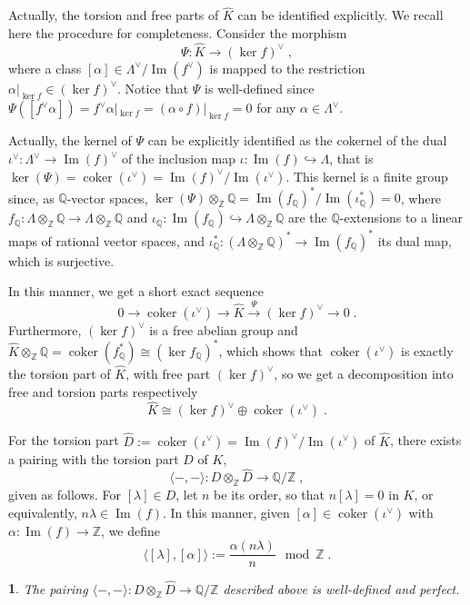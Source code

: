\documentclass[11pt,english]{amsart}
\numberwithin{equation}{section}
\numberwithin{figure}{section}
\theoremstyle{plain}
\theoremstyle{plain}
\newtheorem{lem}[thm]{\protect\lemmaname}
\theoremstyle{definition}
\theoremstyle{remark}
\DeclareMathOperator{\image}{Im}
\newcommand{\ZZ}{\mathbb{Z}}
\newcommand{\QQ}{\mathbb{Q}}
\newcommand{\coker}{\operatorname{coker}}
\providecommand{\lemmaname}{Lemma}
\begin{document}
Actually, the torsion and free parts of $\hat{K}$ can be identified explicitly. We recall here the procedure for completeness. Consider the morphism
$$
    \Psi: \hat{K} \to (\ker f)^\vee\; , 
$$
where a class $[\alpha] \in \Lambda^\vee/\image(f^\vee)$ is mapped to the restriction $\alpha|_{\ker f} \in (\ker f)^\vee$. Notice that $\Psi$ is well-defined since $\Psi([f^\vee\alpha]) = f^\vee\alpha|_{\ker f} = (\alpha \circ f)|_{\ker f} = 0$ for any $\alpha \in \Lambda^\vee$.

Actually, the kernel of $\Psi$ can be explicitly identified as the cokernel of the dual $\iota^\vee: \Lambda^\vee \to \image(f)^\vee$ of the inclusion map $\iota: \image(f) \hookrightarrow \Lambda$, that is $\ker(\Psi) = \coker(\iota^\vee) = \image(f)^\vee/\image(\iota^\vee)$.
This kernel is a finite group since, as $\QQ$-vector spaces, $\ker(\Psi) \otimes_\ZZ \QQ = \image(f_\QQ)^*/\image(\iota_\QQ^*) = 0$, where $f_\QQ: \Lambda \otimes_\ZZ \QQ \to \Lambda \otimes_\ZZ \QQ$ and $\iota_\QQ: \image(f_\QQ)\hookrightarrow \Lambda \otimes_\ZZ \QQ$ are the $\QQ$-extensions to a linear maps of rational vector spaces, and $\iota_\QQ^*: (\Lambda \otimes_\ZZ \QQ)^* \to \image(f_\QQ)^*$ its dual map, which is surjective.

In this manner, we get a short exact sequence
$$
    0 \longrightarrow \coker(\iota^\vee) \longrightarrow \hat{K} \stackrel{\Psi}{\longrightarrow} (\ker f)^\vee \longrightarrow 0\; .
$$
Furthermore, $(\ker f)^\vee$ is a free abelian group and $\hat{K} \otimes_\ZZ \QQ = \coker(f^*_\QQ) \cong (\ker f_\QQ)^*$, which shows that $\coker(\iota^\vee)$ is exactly the torsion part of $\hat{K}$, with free part $(\ker f)^\vee$, so we get a decomposition into free and torsion parts respectively
$$
    \hat{K} \cong (\ker f)^\vee \oplus \coker(\iota^\vee)\; .
$$

For the torsion part $\hat{D} :=\coker(\iota^\vee) = \image(f)^\vee/\image(\iota^\vee)$ of $\hat{K}$, there exists a pairing with the torsion part $D$ of $K$,
\begin{equation*}
    \langle-, -\rangle: D \otimes_\ZZ \hat{D} \to \QQ/\ZZ\; ,
\end{equation*}
given as follows. For $[\lambda] \in D$, let $n$ be its order, so that $n[\lambda] = 0$ in $K$, or equivalently, $n\lambda \in \image(f)$. In this manner, given $[\alpha] \in \coker(\iota^\vee)$ with $\alpha: \image(f) \to \ZZ$, we define
$$
    \langle[\lambda],[\alpha]\rangle := \frac{\alpha(n\lambda)}{n} \mod \ZZ\; .
$$

\begin{lem}\label{lem:pairing-well-defined}
The pairing $\langle-, -\rangle: D \otimes_\ZZ \hat{D} \to \QQ/\ZZ$ described above is well-defined and perfect.
\end{lem}
\end{document}
